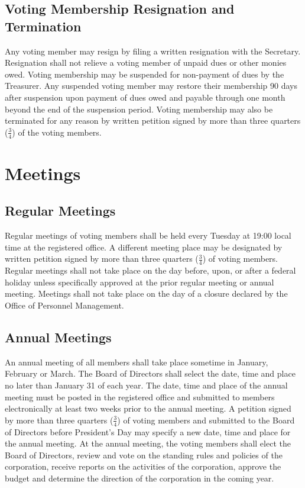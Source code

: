 \documentclass[10pt,letterpaper,titlepage]{article}
\begin{document}
\subsection{Voting Membership Resignation and Termination}

Any voting member may resign by filing a written resignation with the
Secretary.
Resignation shall not relieve a voting member of unpaid dues or other monies
owed.
Voting membership may be suspended for non-payment of dues by the Treasurer.
Any suspended voting member may restore their membership 90 days after
suspension upon payment of dues owed and payable through one month beyond the
end of the suspension period.
Voting membership may also be terminated for any reason by written petition
signed by more than three quarters ($\frac{3}{4}$) of the voting members.


\section{Meetings}

\subsection{Regular Meetings}

Regular meetings of voting members shall be held every Tuesday at 19:00 local
time at the registered office.
A different meeting place may be designated by written petition signed by more
than three quarters ($\frac{3}{4}$) of voting members.
Regular meetings shall not take place on the day before, upon, or after a
federal holiday unless specifically approved at the prior regular meeting or
annual meeting.
Meetings shall not take place on the day of a closure declared by the Office of
Personnel Management.

\subsection{Annual Meetings}

An annual meeting of all members shall take place sometime in January, February
or March.
The Board of Directors shall select the date, time and place no later than
January 31 of each year.
The date, time and place of the annual meeting must be posted in the registered
office and submitted to members electronically at least two weeks prior to the
annual meeting.
A petition signed by more than three quarters ($\frac{3}{4}$) of voting members
and submitted to the Board of Directors before President’s Day may specify a
new date, time and place for the annual meeting.
At the annual meeting, the voting members shall elect the Board of Directors,
review and vote on the standing rules and policies of the corporation, receive
reports on the activities of the corporation, approve the budget and determine
the direction of the corporation in the coming year.
\end{document}
